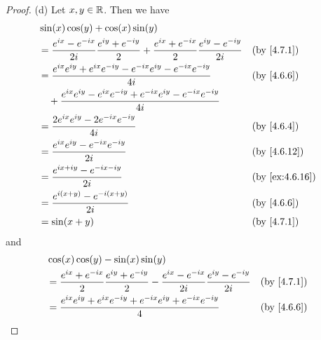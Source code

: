 \begin{proof}{(d)}
  Let \(x, y \in \mathbb{R}\).
  Then we have
  \begin{align*}
     & \sin(x) \cos(y) + \cos(x) \sin(y)                                                                                                                                    \\
     & = \dfrac{e^{i x} - e^{- i x}}{2 i} \dfrac{e^{i y} + e^{- i y}}{2} + \dfrac{e^{i x} + e^{- i x}}{2} \dfrac{e^{i y} - e^{- i y}}{2i} &  & \text{(by \cref{4.7.1})}     \\
     & = \dfrac{e^{i x} e^{i y} + e^{i x} e^{- i y} - e^{- i x} e^{i y} - e^{- i x} e^{- i y}}{4i}                                        &  & \text{(by \cref{4.6.6})}     \\
     & \quad + \dfrac{e^{i x} e^{i y} - e^{i x} e^{- i y} + e^{- i x} e^{i y} - e^{- i x} e^{- i y}}{4i}                                                                    \\
     & = \dfrac{2 e^{i x} e^{i y} - 2 e^{- i x} e^{- i y}}{4i}                                                                            &  & \text{(by \cref{4.6.4})}     \\
     & = \dfrac{e^{i x} e^{i y} - e^{- i x} e^{- i y}}{2i}                                                                                &  & \text{(by \cref{4.6.12})}    \\
     & = \dfrac{e^{i x + i y} - e^{- i x - i y}}{2i}                                                                                      &  & \text{(by \cref{ex:4.6.16})} \\
     & = \dfrac{e^{i (x + y)} - e^{- i (x + y)}}{2i}                                                                                      &  & \text{(by \cref{4.6.6})}     \\
     & = \sin(x + y)                                                                                                                      &  & \text{(by \cref{4.7.1})}
  \end{align*}
  and
  \begin{align*}
     & \cos(x) \cos(y) - \sin(x) \sin(y)                                                                                                                                   \\
     & = \dfrac{e^{i x} + e^{- i x}}{2} \dfrac{e^{i y} + e^{- i y}}{2} - \dfrac{e^{i x} - e^{- i x}}{2i} \dfrac{e^{i y} - e^{- i y}}{2i} &  & \text{(by \cref{4.7.1})}     \\
     & = \dfrac{e^{i x} e^{i y} + e^{i x} e^{- i y} + e^{- i x} e^{i y} + e^{- i x} e^{- i y}}{4}                                        &  & \text{(by \cref{4.6.6})}     \\

\end{align*}
\end{proof}
